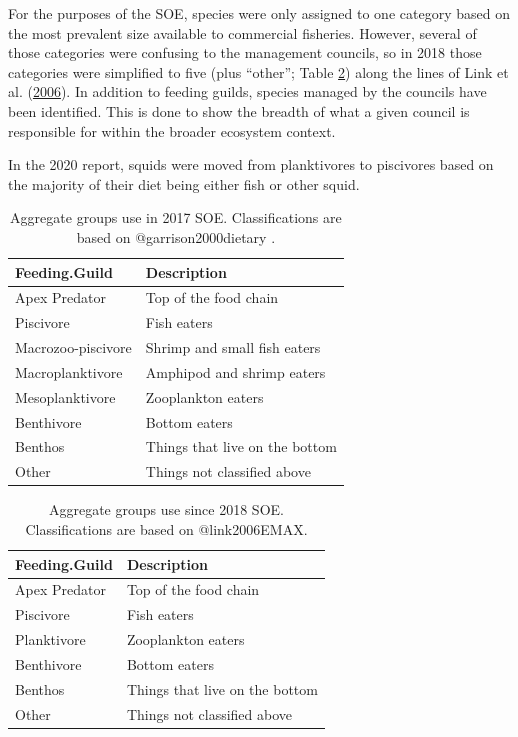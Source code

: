 \documentclass[
]{book}
\begin{document}
For the purposes of the SOE, species were only assigned to one category based on the most prevalent size available to commercial fisheries. However, several of those categories were confusing to the management councils, so in 2018 those categories were simplified to five (plus ``other''; Table \ref{tab:soe2018class}) along the lines of Link et al. (\protect\hyperlink{ref-link2006EMAX}{2006}). In addition to feeding guilds, species managed by the councils have been identified. This is done to show the breadth of what a given council is responsible for within the broader ecosystem context.

In the 2020 report, squids were moved from planktivores to piscivores based on the majority of their diet being either fish or other squid.

\begin{table}

\caption{\label{tab:soe2017class}Aggregate groups use in 2017 SOE.  Classifications are based on @garrison2000dietary . \label{}}
\centering
\begin{tabular}[t]{ll}
\toprule
Feeding.Guild & Description\\
\midrule
Apex Predator & Top of the food chain\\
Piscivore & Fish eaters\\
Macrozoo-piscivore & Shrimp and small fish eaters\\
Macroplanktivore & Amphipod and shrimp eaters\\
Mesoplanktivore & Zooplankton eaters\\
\addlinespace
Benthivore & Bottom eaters\\
Benthos & Things that live on the bottom\\
Other & Things not classified above\\
\bottomrule
\end{tabular}
\end{table}

\begin{table}

\caption{\label{tab:soe2018class}Aggregate groups use since 2018 SOE.  Classifications are based on @link2006EMAX.}
\centering
\begin{tabular}[t]{ll}
\toprule
Feeding.Guild & Description\\
\midrule
Apex Predator & Top of the food chain\\
Piscivore & Fish eaters\\
Planktivore & Zooplankton eaters\\
Benthivore & Bottom eaters\\
Benthos & Things that live on the bottom\\
\addlinespace
Other & Things not classified above\\
\bottomrule
\end{tabular}
\end{table}
\end{document}
